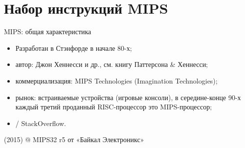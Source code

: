 \section{Набор инструкций MIPS}

\begin{frame}{MIPS: общая характеристика}
\begin{itemize}[<+->]
    \item Разработан в Стэнфорде в начале 80-х;
    \item автор: Джон Хеннесси и др., см. книгу Паттерсона \& Хеннесси;
    \item коммерциализация: MIPS Technologies (Imagination Technologies);
    \item рынок: встраиваемые устройства (игровые консоли),
    в середине-конце 90-х каждый третий проданный RISC-процессор это MIPS-процессор;
    \item {} / StackOverflow.
\end{itemize}
\end{frame}

\begin{frame}{ (2015) @ MIPS32 r5 от «Байкал Электроникс»}
\end{frame}

